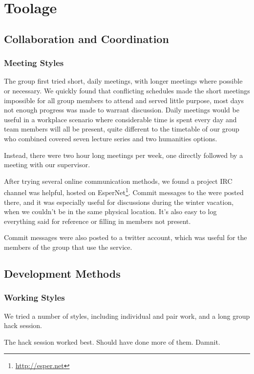 \chapter{Toolage}

\section{Collaboration and Coordination}

  \subsection{Meeting Styles}
    The group first tried short, daily meetings, with longer meetings where possible or necessary.
    We quickly found that conflicting schedules made the short meetings impossible for all group members to attend and served little purpose, most days not enough progress was made to warrant discussion.
    Daily meetings would be useful in a workplace scenario where considerable time is spent every day and team members will all be present, quite different to the timetable of our group who combined covered seven lecture series and two humanities options.

    Instead, there were two hour long meetings per week, one directly followed by a meeting with our supervisor.

    After trying several online communication methods, we found a project IRC channel was helpful, hosted on EsperNet\footnote{\url{http://esper.net}}.
    Commit messages to the were posted there, and it was especially useful for discussions during the winter vacation, when we couldn't be in the same physical location.
    It's also easy to log everything said for reference or filling in members not present.

    Commit messages were also posted to a twitter account, which was useful for the members of the group that use the service.


\section{Development Methods}

  \subsection{Working Styles}
    We tried a number of styles, including individual and pair work, and a long group hack session.

    The hack session worked best.
    Should have done more of them.
    Damnit.

